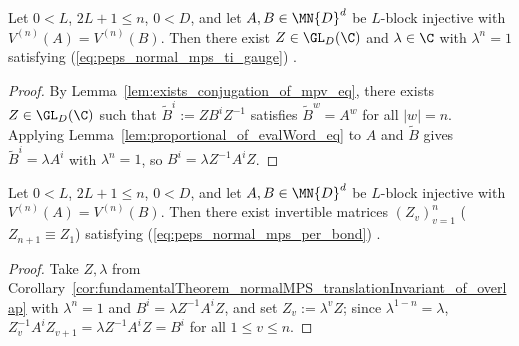 \begin{corollary}%
    \label{cor:fundamentalTheorem_normalMPS_translationInvariant_of_overlap}
    \leanok
    Let $0 < L$, $2L + 1 \le n$, $0<D$, and let $A,B\in\MN{D}^d$ be $L$-block
    injective with $V^{(n)}(A) = V^{(n)}(B)$. Then there exist $Z\in\GL_D(\C)$
    and $\lambda\in\C$ with $\lambda^n = 1$ satisfying
    (\ref{eq:peps_normal_mps_ti_gauge})
    \cite[Section~``Normal MPS: alternative proof'']{Molnar2018NormalPEPS}.
\end{corollary}
\begin{proof}\leanok
    By Lemma~\ref{lem:exists_conjugation_of_mpv_eq}, there exists $Z\in\GL_D(\C)$
    such that $\widetilde B^i := Z B^i Z^{-1}$ satisfies $\widetilde B^w = A^w$
    for all $|w|=n$. Applying Lemma~\ref{lem:proportional_of_evalWord_eq} to $A$
    and $\widetilde B$ gives $\widetilde B^i = \lambda A^i$ with $\lambda^n=1$,
    so $B^i = \lambda Z^{-1} A^i Z$.
\end{proof}

\begin{corollary}%
    \label{cor:fundamentalTheorem_normalMPS_of_overlap}
    \leanok
    Let $0 < L$, $2L + 1 \le n$, $0<D$, and let $A,B\in\MN{D}^d$ be $L$-block
    injective with $V^{(n)}(A)=V^{(n)}(B)$. Then there exist invertible matrices
    $(Z_v)_{v=1}^n$ ($Z_{n+1}\equiv Z_1$) satisfying
    (\ref{eq:peps_normal_mps_per_bond})
    \cite[Section~``Normal MPS: alternative proof'']{Molnar2018NormalPEPS}.
\end{corollary}
\begin{proof}\leanok
    Take $Z,\lambda$ from
    Corollary~\ref{cor:fundamentalTheorem_normalMPS_translationInvariant_of_overlap}
    with $\lambda^n=1$ and $B^i=\lambda Z^{-1}A^i Z$, and set
    $Z_v := \lambda^v Z$; since $\lambda^{1-n}=\lambda$,
    $Z_v^{-1} A^i Z_{v+1} = \lambda Z^{-1} A^i Z = B^i$ for all $1\le v\le n$.
\end{proof}
